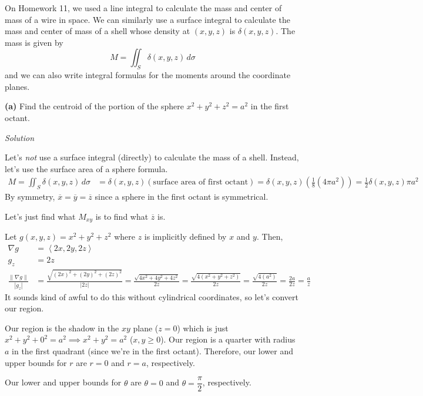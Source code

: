 \documentclass{article}
\newcommand{\lrp}[1]{\left( #1 \right)}
\newcommand{\lra}[1]{\left\langle #1 \right\rangle}
\newcommand{\norm}[1]{\left\lVert #1 \right\rVert}
\newcommand{\Solution}{\textit{Solution}}
\begin{document}
On Homework 11, we used a line integral to calculate the mass and center of mass
of a wire in space. We can similarly use a surface integral to calculate the mass and
center of mass of a shell whose density at $(x,y,z)$ is $\delta(x,y,z)$. The mass is given by
\begin{equation*}
    M=\iint_S \delta (x,y,z)\,d\sigma
\end{equation*}
and we can also write integral formulas for the moments around the coordinate planes.

{}\textbf{(a)} Find the centroid of the portion of the sphere $x^2+y^2+z^2=a^2$ in the first octant.

\Solution

Let's \textit{not} use a surface integral (directly) to calculate the mass of a shell. Instead, let's use the surface area of a sphere formula.
\begin{align*}
    M=\iint_S \delta(x,y,z)\,d\sigma &=\delta(x,y,z)\lrp{\text{surface area of first octant}}=\delta(x,y,z)\lrp{\frac{1}{8}(4\pi a^2)}=\frac{1}{2}\delta(x,y,z)\pi a^2
\end{align*}
By symmetry, $\overline{x}=\overline{y}=\overline{z}$ since a sphere in the first octant is symmetrical.

Let's just find what $M_{xy}$ is to find what $\overline{z}$ is.

Let $g(x,y,z)=x^2+y^2+z^2$ where $z$ is implicitly defined by $x$ and $y$. Then,
\begin{align*}
    \nabla g&=\lra{2x,2y,2z}\\
    g_z&=2z\\
    \frac{\norm{\nabla g}}{\left|g_z\right|}&=\frac{\sqrt{(2x)^2+(2y)^2+(2z)^2}}{\left|2z\right|}=\frac{\sqrt{4x^2+4y^2+4z^2}}{2z}=\frac{\sqrt{4(x^2+y^2+z^2)}}{2z}=\frac{\sqrt{4(a^2)}}{2z}=\frac{2a}{2z}=\frac{a}{z}
\end{align*}
It sounds kind of awful to do this without cylindrical coordinates, so let's convert our region.

Our region is the shadow in the $xy$ plane ($z=0$) which is just $x^2+y^2+0^2=a^2\implies x^2+y^2=a^2$ ($x,y\geq 0$). Our region is a quarter with radius $a$ in the first quadrant (since we're in the first octant). Therefore, our lower and upper bounds for $r$ are $r=0$ and $r=a$, respectively.

Our lower and upper bounds for $\theta$ are $\theta=0$ and $\theta=\dfrac{\pi}{2}$, respectively.
\end{document}
